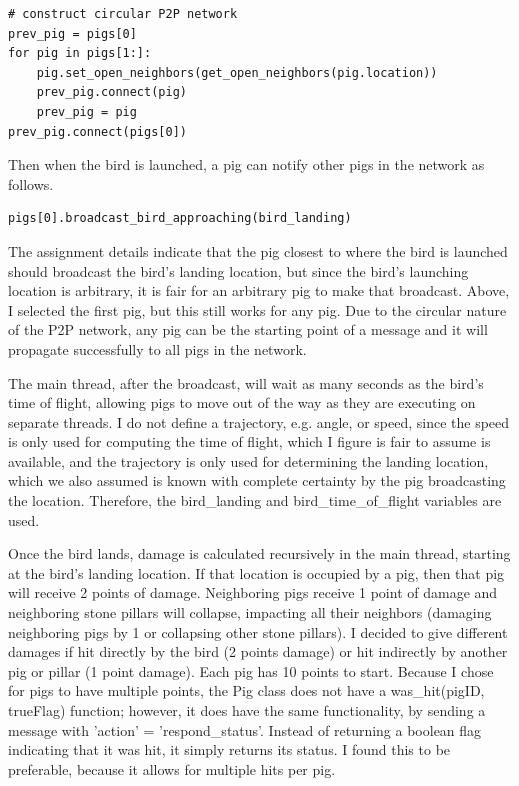 \documentclass[]{article}
\begin{document}
\begin{lstlisting}
# construct circular P2P network
prev_pig = pigs[0]
for pig in pigs[1:]:
    pig.set_open_neighbors(get_open_neighbors(pig.location))
    prev_pig.connect(pig)
    prev_pig = pig
prev_pig.connect(pigs[0])
\end{lstlisting}

Then when the bird is launched, a pig can notify other pigs in the network as follows.

\begin{lstlisting}
pigs[0].broadcast_bird_approaching(bird_landing)
\end{lstlisting}

The assignment details indicate that the pig closest to where the bird is launched should broadcast the bird's landing location, but since the bird's launching location is arbitrary, it is fair for an arbitrary pig to make that broadcast. Above, I selected the first pig, but this still works for any pig. Due to the circular nature of the P2P network, any pig can be the starting point of a message and it will propagate successfully to all pigs in the network.

The main thread, after the broadcast, will wait as many seconds as the bird's time of flight, allowing pigs to move out of the way as they are executing on separate threads. I do not define a trajectory, e.g. angle, or speed, since the speed is only used for computing the time of flight, which I figure is fair to assume is available, and the trajectory is only used for determining the landing location, which we also assumed is known with complete certainty by the pig broadcasting the location. Therefore, the bird\_landing and bird\_time\_of\_flight variables are used.

Once the bird lands, damage is calculated recursively in the main thread, starting at the bird's landing location. If that location is occupied by a pig, then that pig will receive 2 points of damage. Neighboring pigs receive 1 point of damage and neighboring stone pillars will collapse, impacting all their neighbors (damaging neighboring pigs by 1 or collapsing other stone pillars). I decided to give different damages if hit directly by the bird (2 points damage) or hit indirectly by another pig or pillar (1 point damage). Each pig has 10 points to start. Because I chose for pigs to have multiple points, the Pig class does not have a was\_hit(pigID, trueFlag) function; however, it does have the same functionality, by sending a message with 'action' = 'respond\_status'. Instead of returning a boolean flag indicating that it was hit, it simply returns its status. I found this to be preferable, because it allows for multiple hits per pig.
\end{document}
